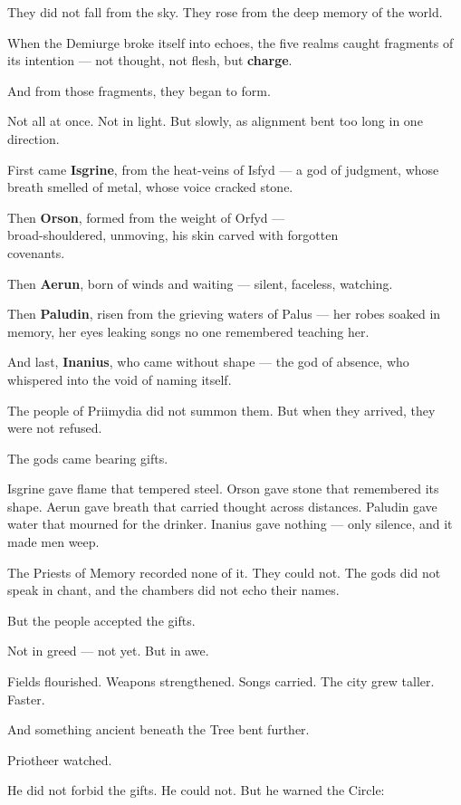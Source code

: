 \documentclass[12pt]{article}
\begin{document}
They did not fall from the sky.  
They rose from the deep memory of the world.

When the Demiurge broke itself into echoes, the five realms caught fragments of its intention —  
not thought, not flesh, but \textbf{charge}.

And from those fragments, they began to form.

Not all at once.  
Not in light.  
But slowly, as alignment bent too long in one direction.

First came \textbf{Isgrine}, from the heat-veins of Isfyd — a god of judgment, whose breath smelled of metal, whose voice cracked stone.  

Then \textbf{Orson}, formed from the weight of Orfyd — \\
broad-shouldered, unmoving, his skin carved with forgotten \\
covenants.  

Then \textbf{Aerun}, born of winds and waiting — silent, faceless, watching.  

Then \textbf{Paludin}, risen from the grieving waters of Palus — her robes soaked in memory, her eyes leaking songs no one remembered teaching her.  

And last, \textbf{Inanius}, who came without shape — the god of absence, who whispered into the void of naming itself.

The people of Priimydia did not summon them.  
But when they arrived, they were not refused.

The gods came bearing gifts.

Isgrine gave flame that tempered steel.  
Orson gave stone that remembered its shape.  
Aerun gave breath that carried thought across distances.  
Paludin gave water that mourned for the drinker.  
Inanius gave nothing — only silence, and it made men weep.

The Priests of Memory recorded none of it.  
They could not.  
The gods did not speak in chant, and the chambers did not echo their names.

But the people accepted the gifts.

Not in greed — not yet.  
But in awe.

Fields flourished.  
Weapons strengthened.  
Songs carried.  
The city grew taller.  
Faster.

And something ancient beneath the Tree bent further.

Priotheer watched.

He did not forbid the gifts.  
He could not.  
But he warned the Circle:
\end{document}
